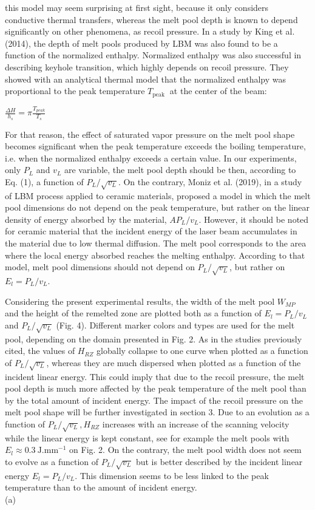 \documentclass[10pt]{article}
\begin{document}
this model may seem surprising at first sight, because it only considers conductive thermal transfers, whereas the melt pool depth is known to depend significantly on other phenomena, as recoil pressure. In a study by King et al. (2014), the depth of melt pools produced by LBM was also found to be a function of the normalized enthalpy. Normalized enthalpy was also successful in describing keyhole transition, which highly depends on recoil pressure. They showed with an analytical thermal model that the normalized enthalpy was proportional to the peak temperature $T_{\text {peak }}$ at the center of the beam:

$\frac{\Delta H}{h_{s}}=\pi \frac{T_{p e a k}}{T_{s}}$

For that reason, the effect of saturated vapor pressure on the melt pool shape becomes significant when the peak temperature exceeds the boiling temperature, i.e. when the normalized enthalpy exceeds a certain value. In our experiments, only $P_{L}$ and $v_{L}$ are variable, the melt pool depth should be then, according to Eq. (1), a function of $P_{L} / \sqrt{v_{L}}$. On the contrary, Moniz et al. (2019), in a study of LBM process applied to ceramic materials, proposed a model in which the melt pool dimensions do not depend on the peak temperature, but rather on the linear density of energy absorbed by the material, $A P_{L} / v_{L}$. However, it should be noted for ceramic material that the incident energy of the laser beam accumulates in the material due to low thermal diffusion. The melt pool corresponds to the area where the local energy absorbed reaches the melting enthalpy. According to that model, melt pool dimensions should not depend on $P_{L} / \sqrt{v_{L}}$, but rather on $E_{l}=P_{L} / v_{L}$.

Considering the present experimental results, the width of the melt pool $W_{M P}$ and the height of the remelted zone are plotted both as a function of $E_{l}=P_{L} / v_{L}$ and $P_{L} / \sqrt{v_{L}}$ (Fig. 4). Different marker colors and types are used for the melt pool, depending on the domain presented in Fig. 2. As in the studies previously cited, the values of $H_{R Z}$ globally collapse to one curve when plotted as a function of $P_{L} / \sqrt{v_{L}}$, whereas they are much dispersed when plotted as a function of the incident linear energy. This could imply that due to the recoil pressure, the melt pool depth is much more affected by the peak temperature of the melt pool than by the total amount of incident energy. The impact of the recoil pressure on the melt pool shape will be further investigated in section 3. Due to an evolution as a function of $P_{L} / \sqrt{v_{L}}, H_{R Z}$ increases with an increase of the scanning velocity while the linear energy is kept constant, see for example the melt pools with $E_{l} \approx 0.3 \mathrm{~J} . \mathrm{mm}^{-1}$ on Fig. 2. On the contrary, the melt pool width does not seem to evolve as a function of $P_{L} / \sqrt{v_{L}}$ but is better described by the incident linear energy $E_{l}=P_{L} / v_{L}$. This dimension seems to be less linked to the peak temperature than to the amount of incident energy.\\
(a)
\end{document}
